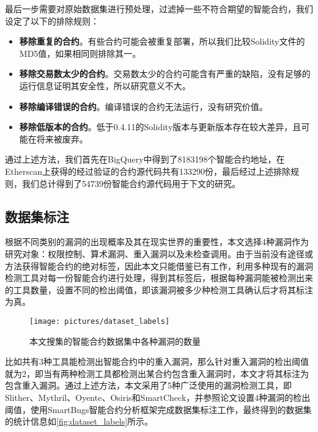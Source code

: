 最后一步需要对原始数据集进行预处理，过滤掉一些不符合期望的智能合约，我们设定了以下的排除规则：
\begin{itemize}
    \item \textbf{移除重复的合约}。有些合约可能会被重复部署，所以我们比较Solidity文件的MD5值，如果相同则排除其一。
    \item \textbf{移除交易数太少的合约}。交易数太少的合约可能含有严重的缺陷，没有足够的运行信息证明其安全性，所以研究意义不大。
    \item \textbf{移除编译错误的合约}。编译错误的合约无法运行，没有研究价值。
    \item \textbf{移除低版本的合约}。低于0.4.11的Solidity版本与更新版本存在较大差异，且可能在将来被废弃。
\end{itemize}

通过上述方法，我们首先在BigQuery中得到了\num{8183198}个智能合约地址，在Etherscan上获得的经过验证的合约源代码共有\num{133290}份，最后经过上述排除规则，我们总计得到了\num{54739}份智能合约源代码用于下文的研究。
\subsection{数据集标注}
\label{sec:数据集标注}
根据不同类别的漏洞的出现概率及其在现实世界的重要性，本文选择4种漏洞作为研究对象：权限控制、算术漏洞、重入漏洞以及未检查调用。由于当前没有途径或方法获得智能合约的绝对标签，因此本文只能借鉴已有工作\cite{yashavant2022scrawld}，利用多种现有的漏洞检测工具对每一份智能合约进行处理，得到其标签后，根据每种漏洞能被检测出来的工具数量，设置不同的检出阈值，即该漏洞被多少种检测工具确认后才将其标注为真。
\begin{figure}[htbp]
    \centering
    \texttt{[image: pictures/dataset\_labels]}
    \caption{\label{fig:dataset_labels}本文搜集的智能合约数据集中各种漏洞的数量}
\end{figure}
比如共有3种工具能检测出智能合约中的重入漏洞，那么针对重入漏洞的检出阈值就为2，即当有两种检测工具都检测出某合约包含重入漏洞时，本文才将其标注为包含重入漏洞。通过上述方法，本文采用了5种广泛使用的漏洞检测工具，即Slither、Mythril、Oyente、Osiris和SmartCheck，并参照论文\cite{yashavant2022scrawld}设置4种漏洞的检出阈值，使用SmartBugs智能合约分析框架\cite{smartbugs}完成数据集标注工作，最终得到的数据集的统计信息如\autoref{fig:dataset_labels}所示。


